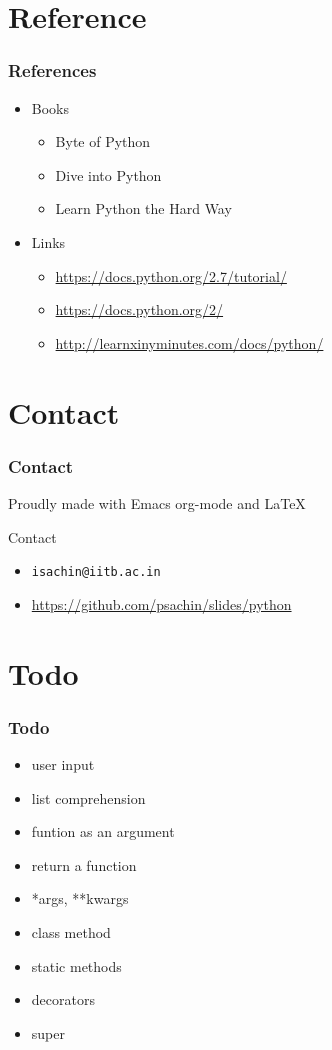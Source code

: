 \documentclass[bigger, presentation]{beamer}
\begin{document}
\section{Reference}
\label{sec-5}
\begin{frame}
\frametitle{References}
\label{sec-5-1}

\begin{itemize}
\item Books
\begin{itemize}
\item Byte of Python
\item Dive into Python
\item Learn Python the Hard Way
\end{itemize}
\item Links
\begin{itemize}
\item \href{https://docs.python.org/2.7/tutorial/}{https://docs.python.org/2.7/tutorial/}
\item \href{https://docs.python.org/2/}{https://docs.python.org/2/}
\item \href{http://learnxinyminutes.com/docs/python/}{http://learnxinyminutes.com/docs/python/}
\end{itemize}
\end{itemize}
\end{frame}
\section{Contact}
\label{sec-6}
\begin{frame}
\frametitle{Contact}
\label{sec-6-1}

   Proudly made with Emacs org-mode and \LaTeX{}
\begin{block}{Contact}
\label{sec-6-1-1}

\begin{itemize}
\item \texttt{isachin@iitb.ac.in}
\item \href{https://github.com/psachin/slides/python}{https://github.com/psachin/slides/python}
\end{itemize}
\end{block}
\end{frame}
\section{Todo}
\label{sec-7}
\begin{frame}
\frametitle{Todo}
\label{sec-7-1}

\begin{itemize}
\item user input
\item list comprehension
\item funtion as an argument
\item return a function
\item *args, **kwargs
\item class method
\item static methods
\item decorators
\item super
\end{itemize}
\end{frame}
\end{document}
